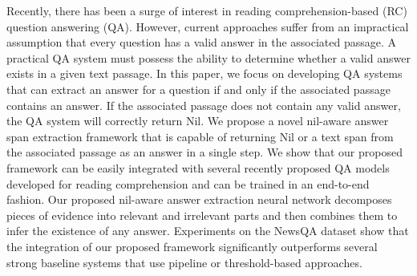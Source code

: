 Recently, there has been a surge of interest in reading comprehension-based (RC) question answering (QA). However, current approaches suffer from an impractical assumption that every question has a valid answer in the associated passage. A practical QA system must possess the ability to determine whether a valid answer exists in a given text passage. In this paper, we focus on developing QA systems that can extract an answer for a question if and only if the associated passage contains an answer. If the associated passage does not contain any valid answer, the QA system will correctly return Nil. We propose a novel nil-aware answer span extraction framework that is capable of returning Nil or a text span from the associated passage as an answer in a single step. We show that our proposed framework can be easily integrated with several recently proposed QA models developed for reading comprehension and can be trained in an end-to-end fashion. Our proposed nil-aware answer extraction neural network decomposes pieces of evidence into relevant and irrelevant parts and then combines them to infer the existence of any answer. Experiments on the NewsQA dataset show that the integration of our proposed framework significantly outperforms several strong baseline systems that use pipeline or threshold-based approaches.
